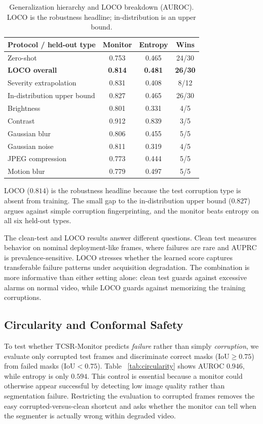 \documentclass[runningheads]{llncs}
\newcommand{\iou}{\mathrm{IoU}}
\newcommand{\monitor}{TCSR-Monitor}
\begin{document}
\begin{table}[t]
\caption{Generalization hierarchy and LOCO breakdown (AUROC). LOCO is the
robustness headline; in-distribution is an upper bound.}
\label{tab:hierarchy}
\centering
\footnotesize
\setlength{\tabcolsep}{4pt}
\begin{tabular}{lccc}
\toprule
Protocol / held-out type & Monitor & Entropy & Wins \\
\midrule
Zero-shot & 0.753 & 0.465 & 24/30 \\
\textbf{LOCO overall} & \textbf{0.814} & \textbf{0.481} & \textbf{26/30} \\
Severity extrapolation & 0.831 & 0.408 & 8/12 \\
In-distribution upper bound & 0.827 & 0.465 & 26/30 \\
\midrule
Brightness        & 0.801 & 0.331 & 4/5 \\
Contrast          & 0.912 & 0.839 & 3/5 \\
Gaussian blur     & 0.806 & 0.455 & 5/5 \\
Gaussian noise    & 0.811 & 0.319 & 4/5 \\
JPEG compression  & 0.773 & 0.444 & 5/5 \\
Motion blur       & 0.779 & 0.497 & 5/5 \\
\bottomrule
\end{tabular}
\end{table}

LOCO ($0.814$) is the robustness headline because the test corruption type is
absent from training. The small gap to the in-distribution upper bound
($0.827$) argues against simple corruption fingerprinting, and the monitor
beats entropy on all six held-out types.

The clean-test and LOCO results answer different questions. Clean test measures
behavior on nominal deployment-like frames, where failures are rare and AUPRC
is prevalence-sensitive. LOCO stresses whether the learned score captures
transferable failure patterns under acquisition degradation. The combination is
more informative than either setting alone: clean test guards against excessive
alarms on normal video, while LOCO guards against memorizing the training
corruptions.

\subsection{Circularity and Conformal Safety}

To test whether \monitor{} predicts \emph{failure} rather than simply
\emph{corruption}, we evaluate only corrupted test frames and discriminate
correct masks ($\iou\ge0.75$) from failed masks ($\iou<0.75$). Table
~\ref{tab:circularity} shows AUROC $0.946$, while entropy is only $0.594$.
This control is essential because a monitor could otherwise appear successful
by detecting low image quality rather than segmentation failure. Restricting
the evaluation to corrupted frames removes the easy corrupted-versus-clean
shortcut and asks whether the monitor can tell when the segmenter is actually
wrong within degraded video.
\end{document}
